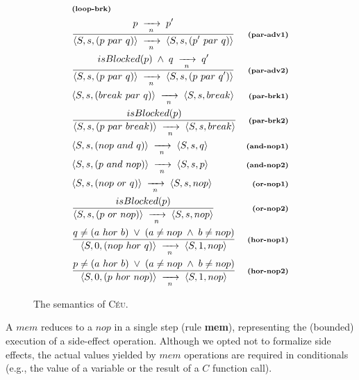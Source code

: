 \documentclass{acm_proc_article-sp}
\newcommand{\CEU}{\textsc{C\'{e}u}\xspace}
\newcommand{\ST}{\1\xrightarrow[~n~]{}\1}
\newcommand{\LL}{\langle}
\newcommand{\RR}{\rangle}
\newcommand{\DS}{\displaystyle}
\newcommand{\rr}[1] {{\textbf{\scriptsize{#1}}}}
\newcommand{\1}{\;}
\newcommand{\2}{\;\;}
\newcommand{\3}{\;\;\;}
\newcommand{\5}{\;\;\;\;\;}
\begin{document}
\begin{figure}
{\begin{eqnarray*}
    & \rr{(loop-brk)}       \\
%
& \frac
    {\DS p \ST p' }
    {\DS \LL S,s, (p~par~q) \RR \ST \LL S,s, (p'~par~q) \RR }
    & \rr{(par-adv1)}      \\
& \frac
    {\DS isBlocked(p) \1\wedge\1 q \ST q' }
    {\DS \LL S,s, (p~par~q) \RR \ST \LL S,s, (p~par~q') \RR }
    & \rr{(par-adv2)}      \\
& \LL S,s, (break~par~q) \RR \ST \LL S,s, break \RR
    & \rr{(par-brk1)}   \\
& \frac
    {\DS isBlocked(p) }
    {\DS \LL S,s, (p~par~break) \RR \ST \LL S,s, break \RR }
    & \rr{(par-brk2)}       \\
& \LL S,s, (nop~and~q) \RR \ST \LL S,s, q \RR
    & \rr{(and-nop1)}   \\
& \LL S,s, (p~and~nop) \RR \ST \LL S,s, p \RR
    & \rr{(and-nop2)}   \\
%
%
& \LL S,s, (nop~or~q) \RR \ST \LL S,s, nop \RR
    & \rr{(or-nop1)}   \\
& \frac
    {\DS isBlocked(p) }
    {\DS \LL S,s, (p~or~nop) \RR \ST \LL S,s, nop \RR }
    & \rr{(or-nop2)}    \\
%
& \frac
    {\DS q \neq (a~hor~b) \1\vee\1 (a \neq nop \1\wedge\1 b \neq nop) }
    {\DS \LL S,0, (nop~hor~q) \RR \ST \LL S,1, nop \RR }
    & \rr{(hor-nop1)}   \\
& \frac
    {\DS p \neq (a~hor~b) \1\vee\1 (a \neq nop \1\wedge\1 b \neq nop) }
    {\DS \LL S,0, (p~hor~nop) \RR \ST \LL S,1, nop \RR }
    & \rr{(hor-nop2)}
%
\end{eqnarray*}
}
%
\caption{ The semantics of \CEU.
\label{fig.sem}
}
\end{figure}

A $mem$ reduces to a $nop$ in a single step (rule \rr{mem}), representing the 
(bounded) execution of a side-effect operation.
Although we opted not to formalize side effects, the actual values yielded by 
$mem$ operations are required in conditionals (e.g., the value of a variable or 
the result of a $C$ function call).
\end{document}
